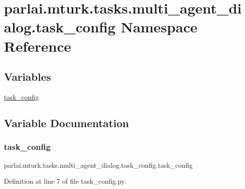 \hypertarget{namespaceparlai_1_1mturk_1_1tasks_1_1multi__agent__dialog_1_1task__config}{}\section{parlai.\+mturk.\+tasks.\+multi\+\_\+agent\+\_\+dialog.\+task\+\_\+config Namespace Reference}
\label{namespaceparlai_1_1mturk_1_1tasks_1_1multi__agent__dialog_1_1task__config}
\subsection*{Variables}
\begin{DoxyCompactItemize}
\item 
\hyperlink{namespaceparlai_1_1mturk_1_1tasks_1_1multi__agent__dialog_1_1task__config_a3629b862f3e08d3533ac195c2c626bf1}{task\+\_\+config}
\end{DoxyCompactItemize}


\subsection{Variable Documentation}
\mbox{\label{namespaceparlai_1_1mturk_1_1tasks_1_1multi__agent__dialog_1_1task__config_a3629b862f3e08d3533ac195c2c626bf1}} 
\subsubsection{\texorpdfstring{task\+\_\+config}{task\_config}}
{\footnotesize\ttfamily parlai.\+mturk.\+tasks.\+multi\+\_\+agent\+\_\+dialog.\+task\+\_\+config.\+task\+\_\+config}



Definition at line 7 of file task\+\_\+config.\+py.

